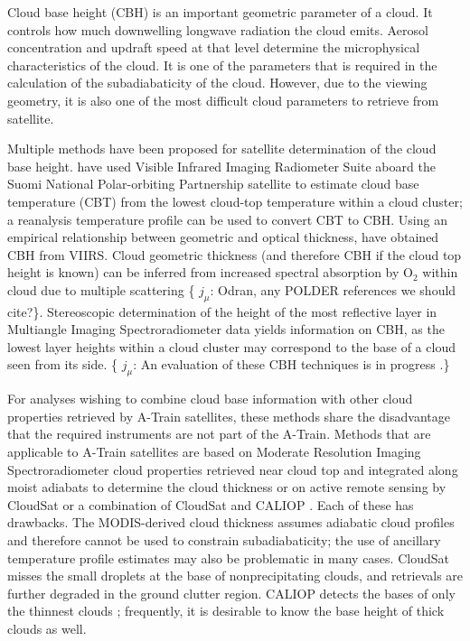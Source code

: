 \documentclass[essd,manuscript]{copernicus}\usepackage[]{graphicx}\usepackage[]{color}
\newcommand{\hlnum}[1]{\textcolor[rgb]{0.686,0.059,0.569}{#1}}%
\newcommand\comment[2]{\{\hlnum{ \textit{#1}: #2}\}}
\newcommand\commentjm[1]{\comment{$j_\mu$}{#1}}
\begin{document}
\introduction  %
\label{sec:intro}
Cloud base height (CBH) is an important geometric parameter of a cloud.  It
controls how much downwelling longwave radiation the cloud emits.  Aerosol
concentration and updraft speed at that level determine the microphysical
characteristics of the cloud.  It is one of the parameters that is required in
the calculation of the subadiabaticity of the cloud.  However, due to the
viewing geometry, it is also one of the most difficult cloud parameters to
retrieve from satellite.

Multiple methods have been proposed for satellite determination of the cloud
base height.  \cite{Zhu2014} have used Visible Infrared Imaging Radiometer Suite
aboard the Suomi National Polar-orbiting Partnership satellite
\citep[VIIRS][]{Cao2014} to estimate cloud base temperature (CBT) from the
lowest cloud-top temperature within a cloud cluster; a reanalysis temperature
profile can be used to convert CBT to CBH.  Using an empirical relationship
between geometric and optical thickness, \cite{Fitch2016} have obtained CBH from
VIIRS.  Cloud geometric thickness (and therefore CBH if the cloud top height is
known) can be inferred from increased spectral absorption by O$_2$ within cloud
due to multiple scattering \citep{Kokhanovsky2005} \commentjm{Odran, any POLDER
  references we should cite?}.  Stereoscopic determination of
the height of the most reflective layer \cite{Naud2005,Naud2007} in Multiangle
Imaging Spectroradiometer data \citep[MISR][]{Diner1998} yields information on
CBH, as the lowest layer heights within a cloud cluster may correspond to the
base of a cloud seen from its side.  \commentjm{An evaluation of these CBH
  techniques is in progress \citep{Boehm2017}.}

For analyses wishing to combine cloud base information with other cloud
properties retrieved by A-Train satellites, these methods share the disadvantage
that the required instruments are not part of the A-Train.  Methods that are
applicable to A-Train satellites are based on Moderate Resolution Imaging
Spectroradiometer \citep[MODIS][]{Platnick2017} cloud properties retrieved near
cloud top and integrated along moist adiabats to determine the cloud thickness
\citep{Meerkoetter2007} or on active remote sensing by CloudSat
\citep[2B-GEOPROF][]{Marchand2008} or a combination of CloudSat and CALIOP
\citep[2B-GEOPROF-LIDAR][]{Mace2014}.  Each of these has drawbacks.  The
MODIS-derived cloud thickness assumes adiabatic cloud profiles and therefore
cannot be used to constrain subadiabaticity; the use of ancillary temperature
profile estimates may also be problematic in many cases.  CloudSat misses the
small droplets at the base of nonprecipitating clouds, and retrievals are
further degraded in the ground clutter region.  CALIOP detects the bases of only
the thinnest clouds \citep[$\tau < 5$][]{Mace2014}; frequently, it is desirable
to know the base height of thick clouds as well.
\end{document}
